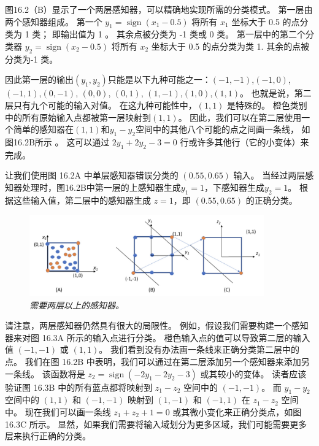 图16.2（B）显示了一个两层感知器，可以精确地实现所需的分类模式。 第一层由两个感知器组成。 
第一个 $y_{1}=\operatorname{sign}\left(x_{1}-0.5\right)$ 将所有 $x_{1}$ 坐标大于 0.5 的点分类为 1 类； 
即输出值为 1 。 其余点被分类为 -1 类或 0 类。 
第一层中的第二个分类器 $y_{2}=\operatorname{sign}\left(x_{2}-0.5\right)$ 将所有 $x_{2}$ 坐标大于 0.5 的点分类为类 1. 其余的点被分类为-1 类。

因此第一层的输出$\left(y_{1}, y_{2}\right)$只能是以下九种可能之一：$(-1,-1)$,$(-1,0)$, $(-1,1)$,$(0,-1)$, 
$(0,0)$, $(0,1)$, $(1,-1)$,$(1,0)$,$(1,1)$。 
也就是说，第二层只有九个可能的输入对值。 在这九种可能性中，$(1,1)$ 是特殊的。 
橙色类别中的所有原始输入点都被第一层映射到$(1,1)$。 
因此，我们可以在第二层使用一个简单的感知器在$(1,1)$和$y_{1}-y_{2}$空间中的其他八个可能的点之间画一条线，
如图16.2B所示 。 这可以通过 $2 y_{1}+2 y_{2}-3=0$ 行或许多其他行（它的小变体）来完成。

让我们使用图 16.2A 中单层感知器错误分类的 $(0.55,0.65)$ 输入。 
当经过两层感知器处理时，图16.2B中第一层的上感知器生成$y_{1}=1$，下感知器生成$y_{2}=1$。 
根据这些输入值，第二层中的感知器生成 $z=1$，即 $(0.55,0.65)$ 的正确分类。

\begin{figure}[H]
	\centering
	\includegraphics[width=0.9\textwidth]{figs/F16.3.png}
	\caption{\textit{需要两层以上的感知器。}}
\end{figure}

请注意，两层感知器仍然具有很大的局限性。 例如，假设我们需要构建一个感知器来对图 16.3A 所示的输入点进行分类。 
橙色输入点的值可以导致第二层的输入值 $(-1,-1)$ 或 $(1,1)$。 我们看到没有办法画一条线来正确分类第二层中的点。 
我们在图 16.2B 中表明，我们可以通过在第二层添加另一个感知器来添加另一条线。 
该函数将是 $z_{2}=\operatorname{sign}\left(-2 y_{1}-2 y_{2}-3\right)$ 或其较小的变体。 
读者应该验证图 16.3B 中的所有蓝点都将映射到 $z_{1}-z_{2}$ 空间中的 $(-1,-1)$。 
而 $y_{1}-y_{2}$ 空间中的 $(1,1)$ 和 $(-1,-1)$ 映射到 $(1,-1)$ 和 $(-1,1 )$ 在 $z_{1}-z_{2}$ 空间中。 
现在我们可以画一条线 $z_{1}+z_{2}+1=0$ 或其微小变化来正确分类点，如图 16.3C 所示。 
显然，如果我们需要将输入域划分为更多区域，我们可能需要更多层来执行正确的分类。

